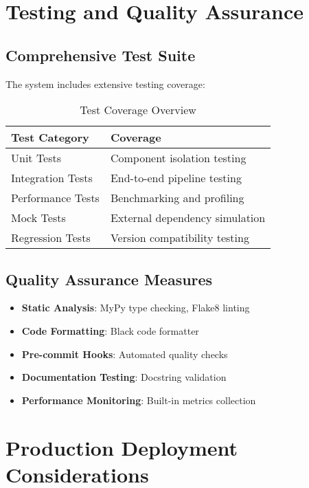 \documentclass[10pt,a4paper,twocolumn]{article}
\begin{document}
\section{Testing and Quality Assurance}

\subsection{Comprehensive Test Suite}

The system includes extensive testing coverage:

\begin{table}[H]
\centering
\begin{tabular}{@{}ll@{}}
\toprule
\textbf{Test Category} & \textbf{Coverage} \\
\midrule
Unit Tests & Component isolation testing \\
Integration Tests & End-to-end pipeline testing \\
Performance Tests & Benchmarking and profiling \\
Mock Tests & External dependency simulation \\
Regression Tests & Version compatibility testing \\
\bottomrule
\end{tabular}
\caption{Test Coverage Overview}
\end{table}

\subsection{Quality Assurance Measures}

\begin{itemize}
    \item \textbf{Static Analysis}: MyPy type checking, Flake8 linting
    \item \textbf{Code Formatting}: Black code formatter
    \item \textbf{Pre-commit Hooks}: Automated quality checks
    \item \textbf{Documentation Testing}: Docstring validation
    \item \textbf{Performance Monitoring}: Built-in metrics collection
\end{itemize}

\section{Production Deployment Considerations}
\end{document}
